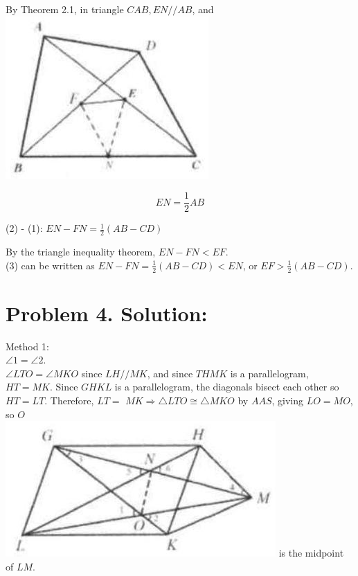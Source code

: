 \documentclass[10pt]{article}
\begin{document}
By Theorem 2.1, in triangle \(C A B, E N / / A B\), and\\
\includegraphics[max width=\textwidth, center]{2025_04_17_97bc1f7e44d93c271a88g-048}

\[
E N=\frac{1}{2} A B
\]

(2) - (1): \(E N-F N=\frac{1}{2}(A B-C D)\)

By the triangle inequality theorem, \(E N-F N<E F\).\\
(3) can be written as \(E N-F N=\frac{1}{2}(A B-C D)<E N\), or \(E F>\frac{1}{2}(A B-C D)\).

\section*{Problem 4. Solution:}
Method 1:\\
\(\angle 1=\angle 2\).\\
\(\angle L T O=\angle M K O\) since \(L H / / M K\), and since \(T H M K\) is a parallelogram, \(H T=M K\). Since \(G H K L\) is a parallelogram, the diagonals bisect each other so \(H T=L T\). Therefore, \(L T=\) \(M K \Rightarrow \triangle L T O \cong \triangle M K O\) by \(A A S\), giving \(L O=M O\), so \(O\)\\
\includegraphics[max width=\textwidth]{2025_04_17_97bc1f7e44d93c271a88g-048(1)} is the midpoint of \(L M\).
\end{document}

